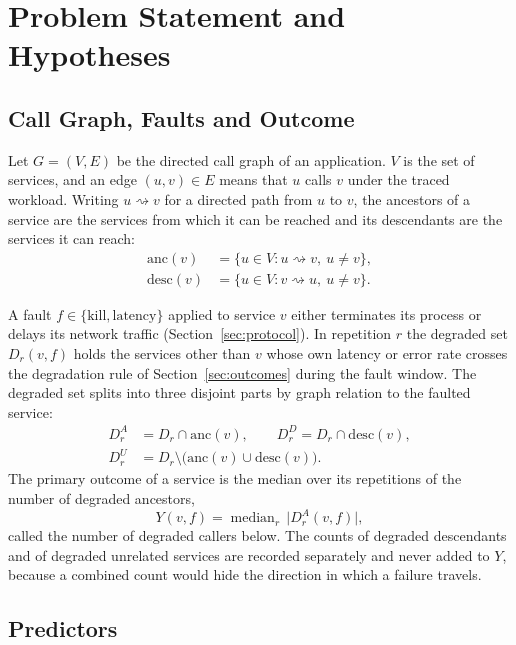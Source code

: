 \section{Problem Statement and Hypotheses}
\label{sec:problem}

\subsection{Call Graph, Faults and Outcome}

Let $G=(V,E)$ be the directed call graph of an application. $V$ is the set of services, and an
edge $(u,v)\in E$ means that $u$ calls $v$ under the traced workload. Writing
$u \rightsquigarrow v$ for a directed path from $u$ to $v$, the ancestors of a service are the
services from which it can be reached and its descendants are the services it can reach:
\begin{align}
\mathrm{anc}(v) &= \{u \in V : u \rightsquigarrow v,\ u \neq v\},\\
\mathrm{desc}(v) &= \{u \in V : v \rightsquigarrow u,\ u \neq v\}.
\end{align}

A fault $f \in \{\text{kill}, \text{latency}\}$ applied to service $v$ either terminates its
process or delays its network traffic (Section~\ref{sec:protocol}). In repetition $r$ the
degraded set $D_r(v,f)$ holds the services other than $v$ whose own latency or error rate
crosses the degradation rule of Section~\ref{sec:outcomes} during the fault window. The
degraded set splits into three disjoint parts by graph relation to the faulted service:
\begin{align}
D_r^{A} &= D_r \cap \mathrm{anc}(v), \qquad D_r^{D} = D_r \cap \mathrm{desc}(v),\\
D_r^{U} &= D_r \setminus \bigl(\mathrm{anc}(v) \cup \mathrm{desc}(v)\bigr).
\end{align}
The primary outcome of a service is the median over its repetitions of the number of degraded
ancestors,
\begin{equation}
Y(v,f) = \operatorname{median}_r \, \lvert D_r^{A}(v,f) \rvert,
\end{equation}
called the number of degraded callers below. The counts of degraded descendants and of
degraded unrelated services are recorded separately and never added to $Y$, because a combined
count would hide the direction in which a failure travels.

\subsection{Predictors}

